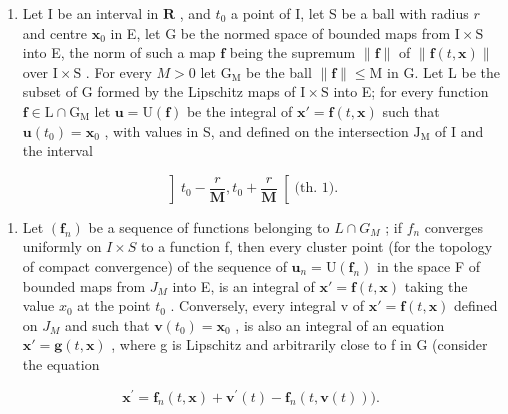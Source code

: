 \begin{enumerate}
\def\labelenumi{* \arabic{enumi})}
\setcounter{enumi}{8}
\tightlist
\item
  Let I be an interval in \(\mathbf{R}\) , and \(t_0\) a point of I, let S be a ball with radius \(r\) and centre \(\mathbf{x}_0\) in E, let G be the normed space of bounded maps from \(\mathrm{I} \times \mathrm{S}\) into E, the norm of such a map \(\mathbf{f}\) being the supremum \(\| \mathbf{f} \|\) of \(\| \mathbf{f}(t, \mathbf{x}) \|\) over \(\mathrm{I} \times \mathrm{S}\) . For every \(M > 0\) let \(\mathrm{G}_{\mathrm{M}}\) be the ball \(\| \mathbf{f} \| \leqslant \mathrm{M}\) in G. Let L be the subset of G formed by the Lipschitz maps of \(\mathrm{I} \times \mathrm{S}\) into E; for every function \(\mathbf{f} \in \mathrm{L} \cap \mathrm{G}_{\mathrm{M}}\) let \(\mathbf{u} = \mathrm{U}(\mathbf{f})\) be the integral of \(\mathbf{x}' = \mathbf{f}(t, \mathbf{x})\) such that \(\mathbf{u}(t_0) = \mathbf{x}_0\) , with values in S, and defined on the intersection \(\mathrm{J}_{\mathrm{M}}\) of I and the interval
\end{enumerate}

\[
\left] t _ {0} - \frac {r}{\mathbf {M}}, t _ {0} + \frac {r}{\mathbf {M}} \right[ \text {(th. 1).}
\]

\begin{enumerate}
\def\labelenumi{\alph{enumi})}
\tightlist
\item
  Let \((\mathbf{f}_{n})\) be a sequence of functions belonging to \(L \cap G_{M}\) ; if \(f_{n}\) converges uniformly on \(I \times S\) to a function f, then every cluster point (for the topology of compact convergence) of the sequence of \(\mathbf{u}_{n} = \mathrm{U}(\mathbf{f}_{n})\) in the space F of bounded maps from \(J_{M}\) into E, is an integral of \(\mathbf{x}' = \mathbf{f}(t, \mathbf{x})\) taking the value \(x_{0}\) at the point \(t_{0}\) . Conversely, every integral v of \(\mathbf{x}' = \mathbf{f}(t, \mathbf{x})\) defined on \(J_{M}\) and such that \(\mathbf{v}(t_{0}) = \mathbf{x}_{0}\) , is also an integral of an equation \(\mathbf{x}' = \mathbf{g}(t, \mathbf{x})\) , where g is Lipschitz and arbitrarily close to f in G (consider the equation
\end{enumerate}

\[
\mathbf {x} ^ {\prime} = \mathbf {f} _ {n} (t, \mathbf {x}) + \mathbf {v} ^ {\prime} (t) - \mathbf {f} _ {n} (t, \mathbf {v} (t))).
\]

